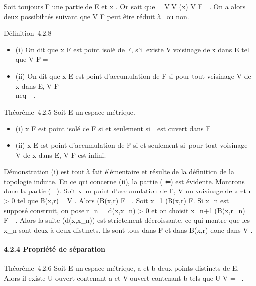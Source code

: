 \documentclass[]{article}
\begin{document}
Soit toujours F une partie de E et x \in\overlineF. On
sait que \forall~~V \in V (x) V \bigcap
F\neq~\varnothing~. On a alors deux possibilités suivant que
V \bigcap F peut être réduit à \x\ ou non.

Définition~4.2.8

\begin{itemize}
\itemsep1pt\parskip0pt
\item
  (i) On dit que x \in F est point isolé de F, s'il existe V voisinage de
  x dans E tel que V \bigcap F = \x\
\item
  (ii) On dit que x \in E est point d'accumulation de F si pour tout
  voisinage V de x dans E, V \bigcap F
  \diagdown\x\\neq~\varnothing~.
\end{itemize}

Théorème~4.2.5 Soit E un espace métrique.

\begin{itemize}
\itemsep1pt\parskip0pt
\item
  (i) x \in F est point isolé de F si et seulement
  si~\x\ est ouvert dans F
\item
  (ii) x \in E est point d'accumulation de F si et seulement si~pour tout
  voisinage V de x dans E, V \bigcap F est infini.
\end{itemize}

Démonstration (i) est tout à fait élémentaire et résulte de la
définition de la topologie induite. En ce qui concerne (ii), la partie (
⇐) est évidente. Montrons donc la partie ( \rigtharrow~). Soit x un point
d'accumulation de F, V un voisinage de x et r > 0 tel que
B(x,r) \subset~ V . Alors (B(x,r) \diagdown\x\) \bigcap
F\neq~\varnothing~. Soit x_1 \in (B(x,r)
\diagdown\x\) \bigcap F. Si x_n est supposé
construit, on pose r_n = d(x,x_n) > 0 et
on choisit x_n+1 \in (B(x,r_n)
\diagdown\x\) \bigcap
F\neq~\varnothing~. Alors la suite (d(x,x_n)) est
strictement décroissante, ce qui montre que les x_n sont deux à
deux distincts. Ils sont tous dans F et dans B(x,r) donc dans V .

\paragraph{4.2.4 Propriété de séparation}

Théorème~4.2.6 Soit E un espace métrique, a et b deux points distincts
de E. Alors il existe U ouvert contenant a et V ouvert contenant b tels
que U \bigcap V = \varnothing~.
\end{document}
